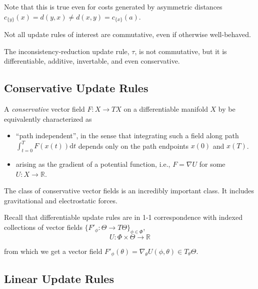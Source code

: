 \documentclass{article}
\begin{document}
Note that this is true even for costs generated by asymmetric distances $c_{\{y\}}(x) = d(y, x) \ne d(x,y) = c_{\{x\}}(a)$.

Not all update rules of interest are commutative, even if otherwise well-behaved.

\begin{example}
    The inconsistency-reduction update rule, $\tau$, is not commutative, but it is differentiable, additive, invertable, and even conservative.
\end{example}


\subsection{Conservative Update Rules}

A \emph{conservative} vector field $F : X \to T X$ on a differentiable manifold $X$ by be equivalently characterized as 
\begin{itemize}
    \item ``path independent'', in the sense that integrating such a field along path
        $\int_{t=0}^{T} F(x(t)) \mathrm dt$ depends only on the path endpoints $x(0)$ and $x(T)$. 
    \item 
        arising as the gradient of a potential function, i.e., $F = \nabla U$ for some $U : X \to \mathbb R$.  
\end{itemize}
The class of conservative vector fields is an incredibly important class. 
It includes gravitational and electrostatic forces.  

Recall that differentiable update rules are in 1-1 correspondence with indexed
collections of vector fields $\{ F'_\phi : \Theta \to T\Theta \}_{\phi \in \Phi}$, 
\[
    U : \Phi \times \Theta\to \mathbb R
\]

from which we get a vector field $F'_\phi(\theta) = \nabla_{\theta} U(\phi, \theta) \in T_{\theta} \Theta$.


\subsection{Linear Update Rules}
\end{document}
